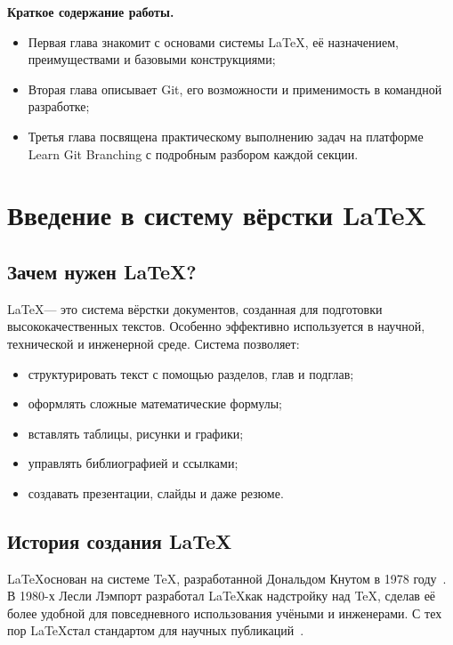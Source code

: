 \documentclass[a4paper,12pt]{report}
\begin{document}
\textbf{Краткое содержание работы.}

\begin{itemize}
  \item Первая глава знакомит с основами системы \LaTeX{}, её назначением, преимуществами и базовыми конструкциями;
  \item Вторая глава описывает Git, его возможности и применимость в командной разработке;
  \item Третья глава посвящена практическому выполнению задач на платформе Learn Git Branching с подробным разбором каждой секции.
\end{itemize}


\chapter{Введение в систему вёрстки \LaTeX}\label{latex_introduction}

\section{Зачем нужен \LaTeX?}
\LaTeX — это система вёрстки документов, созданная для подготовки высококачественных текстов. Особенно эффективно используется в научной, технической и инженерной среде. Система позволяет:
\begin{itemize}[noitemsep]
    \item структурировать текст с помощью разделов, глав и подглав;
    \item оформлять сложные математические формулы;
    \item вставлять таблицы, рисунки и графики;
    \item управлять библиографией и ссылками;
    \item создавать презентации, слайды и даже резюме.
\end{itemize}

\section{История создания \LaTeX}
\LaTeX основан на системе \TeX, разработанной Дональдом Кнутом в 1978 году~\cite{latex_project_site}. В 1980-х Лесли Лэмпорт разработал \LaTeX как надстройку над \TeX, сделав её более удобной для повседневного использования учёными и инженерами. С тех пор \LaTeX стал стандартом для научных публикаций~\cite{latex_official_doc}.
\end{document}
